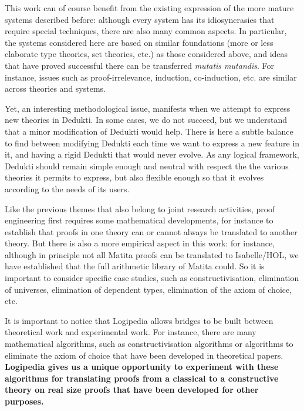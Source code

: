 This work can of course benefit from the existing expression of the
more mature systems described before: although every system has its
idiosyncrasies that require special techniques, there are also many
common aspects. In particular, the systems considered here are based
on similar foundations (more or less elaborate type theories, set
theories, etc.) as those considered above, and ideas that have proved
successful there can be transferred {\em mutatis mutandis}. For
instance, issues such as proof-irrelevance, induction, co-induction,
etc. are similar across theories and systems.

Yet, an interesting methodological issue, manifests when we attempt to
express new theories in Dedukti. In some cases, we do not succeed, but
we understand that a minor modification of Dedukti would help. There
is here a subtle balance to find between modifying Dedukti each time
we want to express a new feature in it, and having a rigid Dedukti
that would never evolve. As any logical framework, Dedukti should
remain simple enough and neutral with respect the the various theories
it permits to express, but also flexible enough so that it evolves
according to the needs of its users.


Like the previous themes that also belong to joint research
activities, proof engineering first requires some mathematical
developments, for instance to establish that proofs in one theory can
or cannot always be translated to another theory. But there is also a
more empirical aspect in this work: for instance, although in
principle not all Matita proofs can be translated to Isabelle/HOL, we
have established that the full arithmetic library of Matita could. So
it is important to consider specific case studies, such as
constructivisation, elimination of universes, elimination of dependent
types, elimination of the axiom of choice, etc.

It is important to notice that Logipedia allows bridges to be built
between theoretical work and experimental work. For instance, there
are many mathematical algorithms, such as constructivisation
algorithms or algorithms to eliminate the axiom of choice that have
been developed in theoretical papers. {\bf Logipedia gives us a unique
opportunity to experiment with these algorithms for translating proofs
from a classical to a constructive theory on real size proofs that
have been developed for other purposes.}


